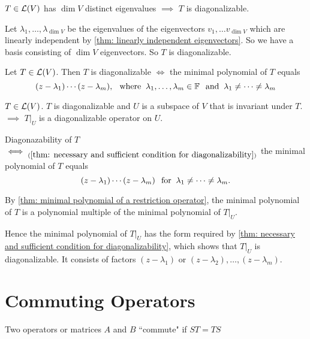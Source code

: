 \setcounter{thm}{57}
\begin{thm} 
  \label{thm: enough eigenvalues implies diagonalizability}
  $T\in \mathcal{L}(V)$ has $\dim V$ distinct eigenvalues $\implies$ $T$ is diagonalizable.
\end{thm}
\begin{prf}
  Let $\lambda_1, \ldots, \lambda_{\dim V}$ be the eigenvalues of the eigenvectors $v_1, \ldots v_{\dim V}$ which are linearly independent by \autoref{thm: linearly independent eigenvectors}. So we have a basis consisting of $\dim V$ eigenvectors. So $T$ is diagonalizable.
\end{prf}

\setcounter{thm}{61}
\begin{thm}
  \label{thm: necessary and sufficient condition for diagonalizability}
  Let $T\in \mathcal{L} (V)$\footnotemark[1]. Then $T$ is diagonalizable $\iff$ the minimal polynomial of $T$ equals
  \begin{equation}
    (z-\lambda_1) \cdots (z-\lambda_m), \;\;\, \text{where}\;\; \lambda_1, \dots, \lambda_m \in \mathbb{F} \;\;\, \text{and}\;\; \lambda_1 \neq \cdots \neq \lambda_m
  \end{equation}
\end{thm}

\setcounter{thm}{64}
\begin{thm}
  \label{thm: restriction of diagonalizable operator to invariant subspace}
  $T\in \mathcal{L}(V)$. $T$ is diagonalizable and $U$ is a subspace of $V$ that is invariant under $T$. \\
  $\implies$ $\left.T\right|_U$ is a diagonalizable operator on $U$.
\end{thm}
\begin{prf}
    Diagonazability of $T$ $\iff_{(\ref{thm: necessary and sufficient condition for diagonalizability})}$ the minimal polynomial of $T$ equals 
  \begin{equation}
    (z-\lambda_1)\cdots(z-\lambda_m) \;\;\, \text{for}\;\; \lambda_1 \neq \cdots \neq \lambda_m.
  \end{equation} 
  
  By \ref{thm: minimal polynomial of a restriction operator}, the minimal polynomial of $T$ is a polynomial multiple of the minimal polynomial of $\left.T\right|_U$.
  
  Hence the minimal polynomial of $\left.T\right|_U$  has the form required by \ref{thm: necessary and sufficient condition for diagonalizability}, which shows that $\left.T\right|_U$ is diagonalizable. It consists of factors $(z-\lambda_1)$ or $(z-\lambda_2), \dots, (z-\lambda_m)$.
\end{prf}


\section{Commuting Operators}
\begin{mydef}
  Two operators or matrices $A$ and $B$ ``commute" if $ST=TS$
\end{mydef}